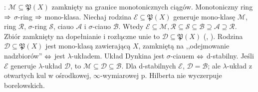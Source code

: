 :  $\mathcal M \subseteq \mathfrak P(X)$ zamknięty na granice monotonicznych ciągów.
Monotoniczny ring $\Rightarrow$ $\sigma$-ring $\Rightarrow$ mono-klasa.
Niechaj rodzina $\mathcal E \subseteq \mathfrak P(X)$ generuje mono-klasę $\mathcal M$, ring $\mathcal R$, $\sigma$-ring $\mathcal S$, ciauo $\mathcal A$ i $\sigma$-ciauo $\mathcal B$.
Wtedy $\mathcal E \subseteq \mathcal M, \mathcal R \subseteq \mathcal S \subseteq \mathcal B \supseteq \mathcal A \supseteq \mathcal R$.
Zbiór zamknięty na dopełnianie i rozłączne unie to  $\mathcal D \subseteq \mathfrak P(X)$ (, ).
Rodzina $\mathcal D \subseteq \mathfrak P(X)$ jest mono-klasą zawierającą $X$, zamkniętą na ,,odejmowanie nadzbiorów'' $\Leftrightarrow$ jest $\lambda$-układem.
Układ Dynkina jest $\sigma$-ciauem $\Leftrightarrow$ d-stabilny.
Jeśli $\mathcal E$ generuje $\lambda$-układ $\mathcal D$, to $\mathcal M \subseteq \mathcal D \subseteq \mathcal B$.
Dla d-stabilnych $\mathcal E$, $\mathcal D = \mathcal B$; ale $\lambda$-układ z otwartych kul w ośrodkowej, $\infty$-wymiarowej p. Hilberta nie wyczerpuje borelowskich. %
